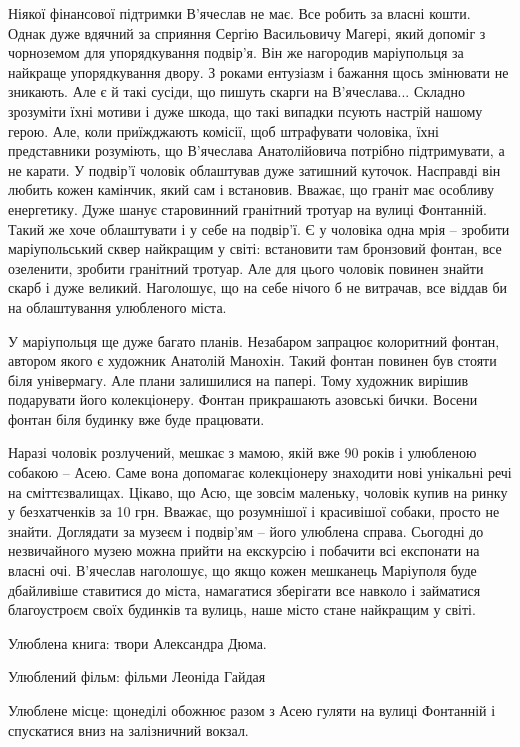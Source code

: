 \begin{multicols}{2}
Ніякої фінансової підтримки  В'ячеслав не має.  Все робить за власні кошти.
Однак дуже вдячний за сприяння Сергію Васильовичу Магері, який допоміг з
чорноземом для упорядкування подвір'я. Він же нагородив маріупольця за найкраще
упорядкування двору. З роками ентузіазм і бажання щось змінювати не зникають.
Але є й такі сусіди, що пишуть скарги на В'ячеслава... Складно зрозуміти їхні
мотиви і дуже шкода, що такі випадки псують настрій нашому герою. Але, коли
приїжджають комісії, щоб штрафувати чоловіка, їхні представники розуміють, що
В'ячеслава Анатолійовича потрібно підтримувати, а не карати. У подвір'ї чоловік
облаштував дуже затишний куточок. Насправді він любить кожен камінчик, який сам
і встановив. Вважає, що граніт має особливу енергетику. Дуже шанує старовинний
гранітний тротуар на вулиці Фонтанній. Такий же хоче облаштувати і у себе на
подвір'ї.  Є  у чоловіка одна мрія – зробити маріупольський сквер найкращим у
світі: встановити там бронзовий фонтан, все озеленити, зробити гранітний
тротуар. Але для цього чоловік повинен знайти скарб і дуже великий. Наголошує,
що на себе нічого б не витрачав, все віддав би на облаштування улюбленого
міста.

У маріупольця ще дуже багато планів. Незабаром запрацює колоритний фонтан,
автором якого є художник Анатолій Манохін. Такий фонтан повинен був стояти біля
універмагу. Але плани залишилися на папері. Тому художник вирішив подарувати
його колекціонеру. Фонтан прикрашають азовські бички. Восени фонтан біля
будинку вже буде працювати.

Наразі чоловік розлучений, мешкає з мамою, якій вже 90 років і улюбленою
собакою – Асею. Саме вона допомагає колекціонеру знаходити нові унікальні речі
на сміттєзвалищах. Цікаво, що Асю, ще зовсім маленьку, чоловік купив на ринку у
безхатченків за 10 грн. Вважає, що розумнішої і красивішої собаки, просто не
знайти. Доглядати за музеєм і подвір'ям – його улюблена справа. Сьогодні до
незвичайного музею можна прийти на екскурсію і побачити всі експонати на власні
очі. В'ячеслав наголошує, що якщо кожен мешканець Маріуполя буде дбайливіше
ставитися до міста, намагатися зберігати все навколо і займатися благоустроєм
своїх будинків та вулиць, наше місто стане найкращим у світі.

Улюблена книга: твори Александра Дюма.

Улюблений фільм: фільми Леоніда Гайдая

Улюблене місце: щонеділі обожнює разом з Асею гуляти на вулиці Фонтанній і
спускатися вниз на залізничний вокзал.

\end{multicols} %

